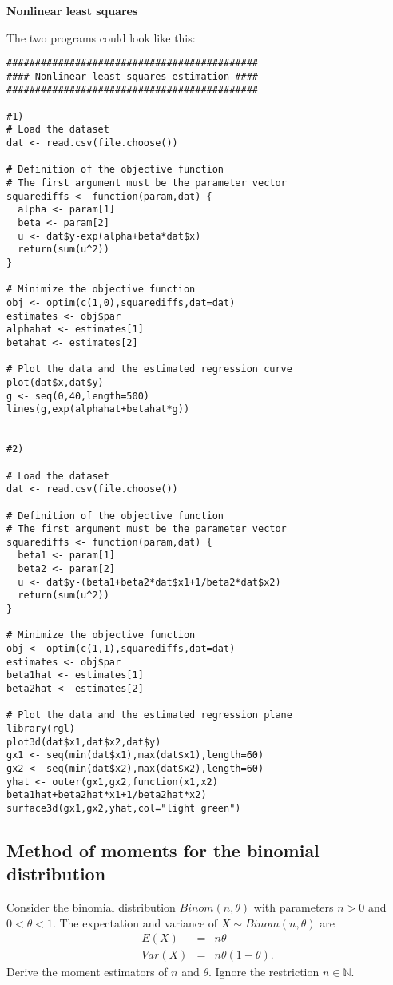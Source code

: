 \documentclass{article}
\begin{document}
\begin{solution}
\textbf{Nonlinear least squares}

\item The two programs could look like this:

\begin{verbatim}
############################################
#### Nonlinear least squares estimation ####
############################################

#1)
# Load the dataset
dat <- read.csv(file.choose())

# Definition of the objective function
# The first argument must be the parameter vector
squarediffs <- function(param,dat) {
  alpha <- param[1]
  beta <- param[2]
  u <- dat$y-exp(alpha+beta*dat$x)
  return(sum(u^2))
}

# Minimize the objective function
obj <- optim(c(1,0),squarediffs,dat=dat)
estimates <- obj$par
alphahat <- estimates[1]
betahat <- estimates[2]

# Plot the data and the estimated regression curve
plot(dat$x,dat$y)
g <- seq(0,40,length=500)
lines(g,exp(alphahat+betahat*g))


#2)

# Load the dataset
dat <- read.csv(file.choose())

# Definition of the objective function
# The first argument must be the parameter vector
squarediffs <- function(param,dat) {
  beta1 <- param[1]
  beta2 <- param[2]
  u <- dat$y-(beta1+beta2*dat$x1+1/beta2*dat$x2)
  return(sum(u^2))
}

# Minimize the objective function
obj <- optim(c(1,1),squarediffs,dat=dat)
estimates <- obj$par
beta1hat <- estimates[1]
beta2hat <- estimates[2]

# Plot the data and the estimated regression plane
library(rgl)
plot3d(dat$x1,dat$x2,dat$y)
gx1 <- seq(min(dat$x1),max(dat$x1),length=60)
gx2 <- seq(min(dat$x2),max(dat$x2),length=60)
yhat <- outer(gx1,gx2,function(x1,x2) beta1hat+beta2hat*x1+1/beta2hat*x2)
surface3d(gx1,gx2,yhat,col="light green")
\end{verbatim}
\end{solution}

\subsection{Method of moments for the binomial distribution}

Consider the binomial distribution $Binom(n,\theta )$ with parameters $n>0$
and $0<\theta <1$. The expectation and variance of $X\sim Binom(n,\theta )$
are%
\begin{eqnarray*}
E(X) &=&n\theta \\
Var(X) &=&n\theta \left( 1-\theta \right) .
\end{eqnarray*}%
Derive the moment estimators of $n$ and $\theta $. Ignore the restriction $%
n\in \mathbb{N}$.
\end{document}
